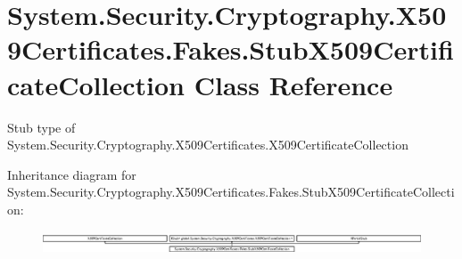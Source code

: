 \hypertarget{class_system_1_1_security_1_1_cryptography_1_1_x509_certificates_1_1_fakes_1_1_stub_x509_certificate_collection}{\section{System.\-Security.\-Cryptography.\-X509\-Certificates.\-Fakes.\-Stub\-X509\-Certificate\-Collection Class Reference}
\label{class_system_1_1_security_1_1_cryptography_1_1_x509_certificates_1_1_fakes_1_1_stub_x509_certificate_collection}
}


Stub type of System.\-Security.\-Cryptography.\-X509\-Certificates.\-X509\-Certificate\-Collection 


Inheritance diagram for System.\-Security.\-Cryptography.\-X509\-Certificates.\-Fakes.\-Stub\-X509\-Certificate\-Collection\-:\begin{figure}[H]
\begin{center}
\leavevmode
\includegraphics[height=0.705734cm]{class_system_1_1_security_1_1_cryptography_1_1_x509_certificates_1_1_fakes_1_1_stub_x509_certificate_collection}
\end{center}
\end{figure}
